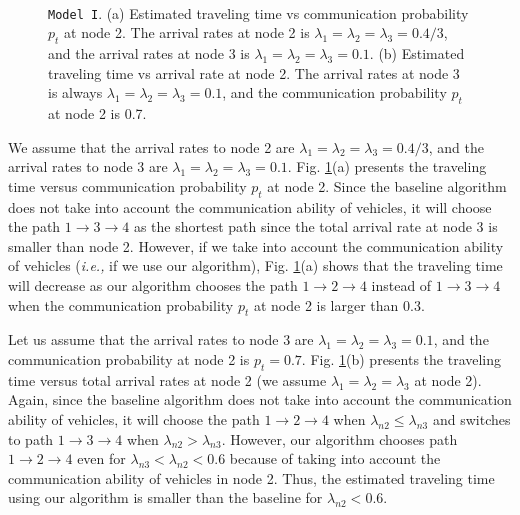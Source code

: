 \documentclass[conference]{IEEEtran}
\newcommand{\ie}{{\em i.e., }}
\newcommand{\modelI}{{\tt{Model I}}}
\begin{document}
\begin{figure}[t!]
\vspace{10pt}
\begin{center}
 \\
\end{center}
\begin{center}
\vspace{-5pt}
\caption{\label{fig:sim_4nodes2paths_modelI} \modelI. (a) Estimated traveling time vs communication probability $p_t$ at node 2. The arrival rates at node 2 is $\lambda_1=\lambda_2=\lambda_3=0.4/3$, and the arrival rates at node 3 is $\lambda_1=\lambda_2=\lambda_3=0.1$. (b) Estimated traveling time vs arrival rate at node 2. The arrival rates at node 3 is always $\lambda_1=\lambda_2=\lambda_3=0.1$, and the communication probability $p_t$ at node 2 is 0.7.}
\vspace{-15pt}
\end{center}
\end{figure}




We assume that the arrival rates to node 2 are $\lambda_1=\lambda_2=\lambda_3=0.4/3$, and the arrival rates to node 3 are $\lambda_1=\lambda_2=\lambda_3=0.1$. Fig. \ref{fig:sim_4nodes2paths_modelI}(a) presents the traveling time versus communication probability $p_t$ at node 2. Since the baseline algorithm does not take into account the communication ability of vehicles, it will choose the path $1\to 3 \to 4$ as the shortest path since the total arrival rate at node 3 is smaller than node 2. However, if we take into account the communication ability of vehicles (\ie if we use our algorithm), Fig. \ref{fig:sim_4nodes2paths_modelI}(a) shows that the traveling time will decrease as our algorithm chooses the path $1\to 2\to 4$ instead of $1\to 3\to 4$ when the communication probability $p_t$ at node 2 is larger than 0.3.



Let us assume that the arrival rates to node 3 are $\lambda_1=\lambda_2=\lambda_3=0.1$, and the communication probability at node 2 is $p_t=0.7$. Fig. \ref{fig:sim_4nodes2paths_modelI}(b) presents the traveling time versus total arrival rates at node 2 (we assume $\lambda_1=\lambda_2=\lambda_3$ at node 2). Again, since the baseline algorithm does not take into account the communication ability of vehicles, it will choose the path $1\to 2 \to 4$ when $\lambda_{n2} \leq \lambda_{n3}$ and switches to path $1\to 3 \to 4$ when $\lambda_{n2} > \lambda_{n3}$. However, our algorithm chooses path $1\to 2 \to 4$ even for $\lambda_{n3}<\lambda_{n2}<0.6$ because of taking into account the communication ability of vehicles in node 2. Thus, the estimated traveling time using our algorithm is smaller than the baseline for $\lambda_{n2}<0.6$.
\end{document}
